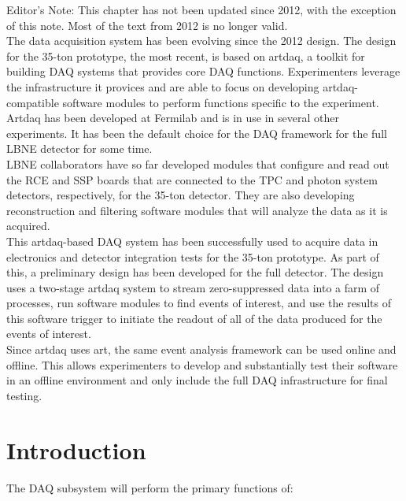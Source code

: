 \begin{editornote}
  Editor's Note: This chapter has not been updated since 2012, with the exception of this note.  Most of the
text from 2012 is no longer valid. \\

The data acquisition system has been evolving since the 2012 design. The design for the 35-ton prototype, the most recent,
 is based on artdaq, a toolkit for building DAQ systems that provides core DAQ functions. Experimenters leverage the infrastructure it provices and are able to focus on developing artdaq-compatible software modules to perform functions specific to the experiment. \\ 

Artdaq has been developed at Fermilab and is in use in several other experiments.  It has been the default choice for the DAQ framework for the full LBNE detector for some time. \\ 

LBNE collaborators have so far developed modules that configure and read out the RCE and SSP boards that are connected to the TPC and photon system detectors, respectively, for the 35-ton detector.  They are also developing reconstruction and filtering software modules that will analyze the data as it is acquired.  \\ 

This artdaq-based DAQ system %
has been successfully used to acquire data in electronics and detector integration tests for the 35-ton prototype.   As part of this, a preliminary design has been developed for the full detector. The design uses a two-stage artdaq system to stream zero-suppressed data into a farm of processes, run software modules to find events of interest, and use the results of this software trigger to initiate the readout of all of the data produced for the events of interest. \\ 

Since artdaq uses art, the same event analysis framework can be used online and offline.  This allows experimenters to develop and substantially test their software in an offline environment and only include the full DAQ infrastructure for final testing.
\end{editornote}



\section{Introduction}
The DAQ subsystem will perform the primary functions of:

